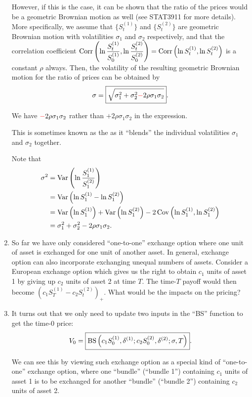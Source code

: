 \begin{enumerate}
However, if this is the case, it can be shown that the ratio of the prices
would be a geometric Brownian motion as well (see STAT3911 for more details).
More specifically, we assume that \(\{S_t^{(1)}\}\) and \(\{S_t^{(2)}\}\) are
geometric Brownian motion with volatilities \(\sigma_1\) and \(\sigma_2\)
respectively, and that the correlation coefficient \(\displaystyle \operatorname{Corr}\qty(\ln
\frac{S_t^{(1)}}{S_0^{(1)}},\ln \frac{S_t^{(2)}}{S_0^{(2)}})=\operatorname{Corr}\qty(\ln
S_t^{(1)},\ln S_t^{(2)})\) is a constant \(\rho\) always.  Then, the
volatility of the resulting geometric Brownian motion for the ratio of prices
can be obtained by
\[
\sigma=\boxed{\sqrt{\sigma_1^{2}+\sigma_2^{2}{\color{red}-}2\rho\sigma_1\sigma_2}}.
\]
\begin{warning}
We have \({\color{red}-}2\rho\sigma_1\sigma_2\) rather than \(+2\rho\sigma_1\sigma_2\)
in the expression.
\end{warning}

This is sometimes known as the  as it ``blends'' the
individual volatilities \(\sigma_1\) and \(\sigma_2\) together.

\begin{pf}
Note that
\begin{align*}
\sigma^2&=\operatorname{Var}\qty(\ln\frac{S_1^{(1)}}{S_1^{(2)}}) \\
&=\operatorname{Var}\qty(\ln S_1^{(1)}-\ln S_1^{(2)}) \\
&=\operatorname{Var}\qty(\ln S_1^{(1)})+\operatorname{Var}\qty(\ln S_1^{(2)})-2\operatorname{Cov}\qty(\ln S_1^{(1)},\ln S_1^{(2)}) \\
&=\sigma_1^2+\sigma_2^2-2\rho\sigma_1\sigma_2.
\end{align*}
\end{pf}

\item So far we have only considered ``one-to-one'' exchange option where one
unit of asset is exchanged for one unit of another asset. In general, exchange
option can also incorporate exchanging unequal numbers of assets. Consider a
European exchange option which gives us the right to obtain \(c_1\) units of
asset 1 by giving up \(c_2\) units of asset 2 at time \(T\). The time-\(T\)
payoff would then become \((c_1S_T^{(1)}-c_2S_t^{(2)})_{+}\). What would be the
impacts on the pricing?

\item \label{it:gen-exchange-opt-fmla} It turns out that we only need to
update two inputs in the ``BS'' function to get the time-0 price:
\[
V_0=\boxed{\operatorname{BS}\qty(c_1S_0^{(1)},\delta^{(1)};c_2S_0^{(2)},\delta^{(2)};\sigma,T)}.
\]
\begin{pf}
We can see this by viewing such exchange option as a special kind of
``one-to-one'' exchange option, where one ``bundle'' 
(``bundle 1'') containing \(c_1\) units of asset 1 is to be exchanged for
another ``bundle'' (``bundle 2'')  containing \(c_2\) units of
asset 2.


\end{pf}
\end{enumerate}
